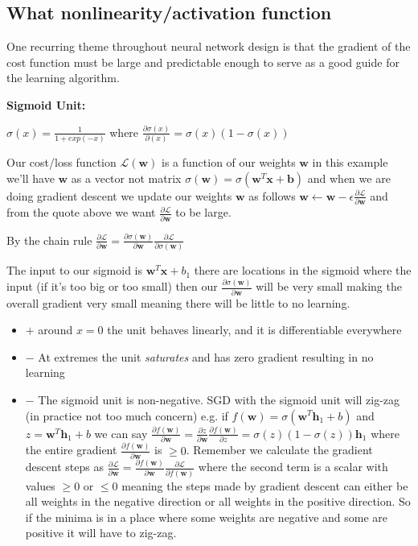 \documentclass[twocolumn, letter, 10pt, landscape]{article}
\newcommand{\mb}{\mathbf}
\newcommand{\tb}{\textbf}
\newcommand{\ti}{\textit}
\newcommand{\bit}{\vspace{-0.1in}\begin{itemize}\setlength\itemsep{-0.05in}}
\newcommand{\eit}{\end{itemize}\vspace{-0.1in}}
\begin{document}
\subsection{What nonlinearity/activation function}
One recurring theme throughout neural network design is that the gradient of the cost function must be large and predictable enough to serve as a good guide for the learning algorithm.

\tb{Sigmoid Unit:}

$\sigma(x) = \frac{1}{1+exp(-x)}$ where $\frac{\partial \sigma (x)}{\partial (x)} = \sigma(x)(1-\sigma(x))$

Our cost/loss function $\mathcal{L}(\mb{w})$ is a function of our weights $\mb{w}$ in this example we'll have $\mb{w}$ as a vector not matrix $\sigma(\mb{w}) = \sigma(\mb{w}^T\mb{x}+\mb{b})$ and when we are doing gradient descent we update our weights $\mb{w}$ as follows $\mb{w}\leftarrow \mb{w}-\epsilon\frac{\partial \mathcal{L}}{\partial\mb{w}}$ and from the quote above we want $\frac{\partial \mathcal{L}}{\partial\mb{w}}$ to be large.

By the chain rule $\frac{\partial \mathcal{L}}{\partial\mb{w}} = \frac{\partial \sigma(\mb{w})}{\partial\mb{w}} \frac{\partial\mathcal{L}}{\partial\sigma(\mb{w})}$

The input to our sigmoid is $\mb{w}^T\mb{x}+b_1$ there are locations in the sigmoid where the input (if it's too big or too small) then our $\frac{\partial \sigma(\mb{w})}{\partial\mb{w}}$ will be very small making the overall gradient very small meaning there will be little to no learning.

\bit{}
\item[$+$] around $x=0$ the unit behaves linearly, and it is differentiable everywhere
\item[$-$] At extremes the unit \ti{saturates} and has zero gradient resulting in no learning
\item[$-$] The sigmoid unit is non-negative. SGD with the sigmoid unit will zig-zag (in practice not too much concern) e.g. if $f(\mb{w})=\sigma(\mb{w}^T\mb{h}_1+b)$ and $z=\mb{w}^T\mb{h}_1+b$ we can say $\frac{\partial f(\mb{w})}{\partial \mb{w}} = \frac{\partial z}{\partial\mb{w}}\frac{\partial f(\mb{w})}{\partial z} = \sigma(z)(1-\sigma(z))\mb{h}_1$ where the entire gradient $\frac{\partial f(\mb{w})}{\partial\mb{w}}$ is $\ge 0$. Remember we calculate the gradient descent steps as $\frac{\partial \mathcal{L}}{\partial \mb{w}} = \frac{\partial f(\mb{w})}{\partial\mb{w}} \frac{\partial \mathcal{L}}{\partial f(\mb{w})}$ where the second term is a scalar with values $\ge 0$ or $\le 0$ meaning the steps made by gradient descent can either be all weights in the negative direction or all weights in the positive direction. So if the minima is in a place where some weights are negative and some are positive it will have to zig-zag.
\eit{}
\end{document}
